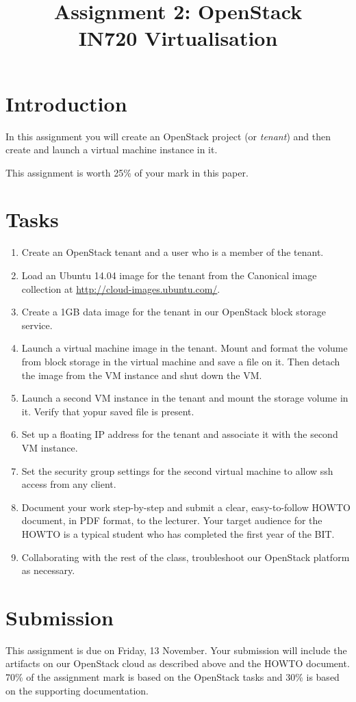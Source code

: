 \documentclass{article}
\begin{document}
\title{Assignment 2: OpenStack \\ IN720 Virtualisation}
\date{}
\maketitle

\section*{Introduction}
In this assignment you will create an OpenStack project (or \emph{tenant}) and then create and launch a virtual machine instance in it.

This assignment is worth 25\% of your mark in this paper.

\section{Tasks}

\begin{enumerate}
	\item Create an OpenStack tenant and a user who is a member of the tenant.
	\item Load an Ubuntu 14.04 image for the tenant from the Canonical image collection at \url{http://cloud-images.ubuntu.com/}.
	\item Create a 1GB data image for the tenant in our OpenStack block storage service.
	\item Launch a virtual machine image in the tenant.  Mount and format the volume from block storage in the virtual machine 
	and save a file on it.  Then detach the image from the VM instance and shut down the VM.
	\item Launch a second VM instance in the tenant and mount the storage volume in it.  Verify that yopur saved file is present.
	\item Set up a floating IP address for the tenant and associate it with the second VM instance.
	\item Set the security group settings for the second virtual machine to allow ssh access from any client.
	\item Document your work step-by-step and submit a clear, easy-to-follow HOWTO document, in PDF format, to the lecturer.  Your target audience for the HOWTO is a typical student who has completed the first year of the BIT.
	\item Collaborating with the rest of the class, troubleshoot our OpenStack platform as necessary.
\end{enumerate}

\section{Submission}
This assignment is due on Friday, 13 November. Your submission will include the artifacts on our OpenStack cloud as described above and the HOWTO 
document.  70\% of the assignment mark is based on the OpenStack tasks and 30\% is based on the supporting documentation. 
\end{document}
